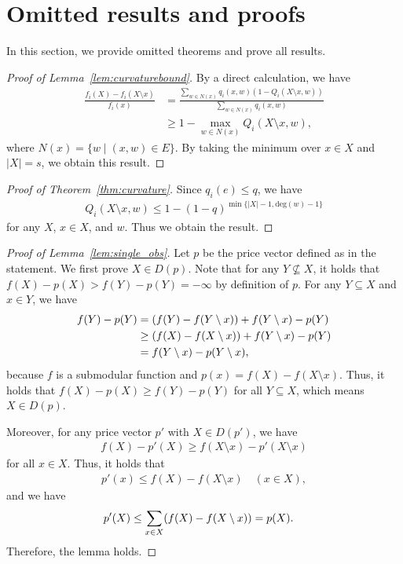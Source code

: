 \documentclass[letterpaper]{article}
\theoremstyle{definition}
\begin{document}
\section{Omitted results and proofs}

In this section, we provide omitted theorems and prove all results. 

\begin{proof}[Proof of Lemma~\ref{lem:curvaturebound}]
By a direct calculation, we have
\begin{align}
  \frac{f_i(X) - f_i(X \setminus x)}{f_i(x)}
  &= \frac{\displaystyle \sum_{w \in N(x)} q_i(x, w) (1 - Q_i(X \setminus x, w))}{\displaystyle \sum_{w \in N(x)} q_i(x, w)} \nonumber \\
  &\ge 1 - \max_{w \in N(x)} Q_i(X \setminus x, w),
\end{align}
where $N(x) = \{ w \mid (x, w) \in E \}$. 
By taking the minimum over $x \in X$ and $|X| = s$, we obtain this result.
\end{proof}

\begin{proof}[Proof of Theorem~\ref{thm:curvature}]
Since $q_i(e) \le q$, we have
\begin{align}
  Q_i(X \setminus x, w) \le 1 - (1 - q)^{\min\{|X|-1, \mathrm{deg}(w)-1\}}
\end{align}
for any $X$, $x\in X$, and $w$.
Thus we obtain the result.
\end{proof}

\begin{proof}[Proof of Lemma~\ref{lem:single_obs}]
Let $p$ be the price vector defined as in the statement. 
We first prove $X \in D(p)$.
Note that for any $Y \not\subseteq X$, it holds that $f(X) - p(X) > f(Y) - p(Y) = -\infty$ by definition of $p$. 
For any \(Y\subseteq X\) and \(x \in Y\), we have
\begin{align}
  f(Y) - p(Y)
  &= (f(Y) - f(Y\setminus x)) + f(Y\setminus x) - p(Y)\notag\\
  &\ge (f(X) - f(X\setminus x)) + f(Y\setminus x) - p(Y)\notag\\
  &= f(Y\setminus x) - p(Y\setminus x),
\end{align}
because $f$ is a submodular function and $p(x)=f(X) - f(X\setminus x)$.
Thus, it holds that \(f(X)-p(X)\ge f(Y)-p(Y)\) for all \(Y \subseteq X\), which means $X \in D(p)$.

Moreover, for any price vector $p'$ with $X \in D(p')$, we have 
\begin{align}
  f(X) - p'(X) \ge f(X \setminus x) - p'(X \setminus x)
\end{align}
for all $x \in X$. 
Thus, it holds that
\begin{align}
  p'(x) \le f(X) - f(X \setminus x) \quad (x \in X), 
\end{align}
and we have
\begin{align}
  p'(X)
  &\le \sum_{x \in X} (f(X) - f(X \setminus x)) = p(X)\notag.
\end{align}
Therefore, the lemma holds.
\end{proof}
\end{document}
